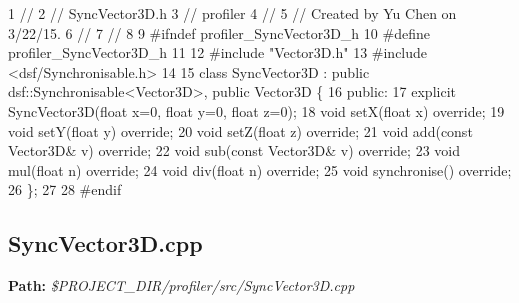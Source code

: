 \begin{DoxyCodeInclude}
1 \textcolor{comment}{//}
2 \textcolor{comment}{//  SyncVector3D.h}
3 \textcolor{comment}{//  profiler}
4 \textcolor{comment}{//}
5 \textcolor{comment}{//  Created by Yu Chen on 3/22/15.}
6 \textcolor{comment}{//}
7 \textcolor{comment}{//}
8 
9 \textcolor{preprocessor}{#ifndef profiler\_SyncVector3D\_h}
10 \textcolor{preprocessor}{#define profiler\_SyncVector3D\_h}
11 
12 \textcolor{preprocessor}{#include "Vector3D.h"}
13 \textcolor{preprocessor}{#include <dsf/Synchronisable.h>}
14 
15 \textcolor{keyword}{class }SyncVector3D : \textcolor{keyword}{public} dsf::Synchronisable<Vector3D>, \textcolor{keyword}{public} Vector3D \{
16 \textcolor{keyword}{public}:
17     \textcolor{keyword}{explicit} SyncVector3D(\textcolor{keywordtype}{float} x=0, \textcolor{keywordtype}{float} y=0, \textcolor{keywordtype}{float} z=0);
18     \textcolor{keywordtype}{void} setX(\textcolor{keywordtype}{float} x) \textcolor{keyword}{override};
19     \textcolor{keywordtype}{void} setY(\textcolor{keywordtype}{float} y) \textcolor{keyword}{override};
20     \textcolor{keywordtype}{void} setZ(\textcolor{keywordtype}{float} z) \textcolor{keyword}{override};
21     \textcolor{keywordtype}{void} add(\textcolor{keyword}{const} Vector3D& v) \textcolor{keyword}{override};
22     \textcolor{keywordtype}{void} sub(\textcolor{keyword}{const} Vector3D& v) \textcolor{keyword}{override};
23     \textcolor{keywordtype}{void} mul(\textcolor{keywordtype}{float} n) \textcolor{keyword}{override};
24     \textcolor{keywordtype}{void} div(\textcolor{keywordtype}{float} n) \textcolor{keyword}{override};
25     \textcolor{keywordtype}{void} synchronise() \textcolor{keyword}{override};
26 \};
27 
28 \textcolor{preprocessor}{#endif}
\end{DoxyCodeInclude}
 \hypertarget{_benchmark_program_BenchmarkProgramSyncVector3D_cpp}{}\subsection{Sync\+Vector3\+D.\+cpp}\label{_benchmark_program_BenchmarkProgramSyncVector3D_cpp}
{\bfseries Path\+:} {\itshape \$\+P\+R\+O\+J\+E\+C\+T\+\_\+\+D\+I\+R/profiler/src/\+Sync\+Vector3\+D.cpp} 
